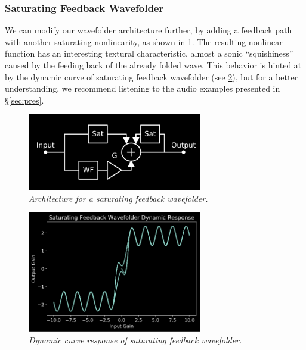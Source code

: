 \documentclass[twoside,a4paper]{article}
\begin{document}
\subsubsection{Saturating Feedback Wavefolder}
%
We can modify our wavefolder architecture further, by adding a
feedback path with another saturating nonlinearity, as shown in
\cref{fb_wave}. The resulting nonlinear function has an interesting
textural characteristic, almost a sonic ``squishiness'' caused by the
feeding back of the already folded wave. This behavior is hinted at by
the dynamic curve of saturating feedback wavefolder (see \cref{fb_dyn}),
but for a better understanding, we recommend listening to the audio
examples presented in \S\ref{sec:pres}.
%
\begin{figure}[h]
    \center
    \includegraphics[width=3in]{../Wavefolder/Pics/fb_arch.png}
    \caption{\label{fb_wave}{\it Architecture for a saturating feedback wavefolder.}}
\end{figure}
%
\begin{figure}[h]
    \center
    \includegraphics[width=3in]{../Wavefolder/Pics/fb_dyn.png}
    \caption{\label{fb_dyn}{\it Dynamic curve response of saturating feedback wavefolder.}}
\end{figure}
%
\end{document}
